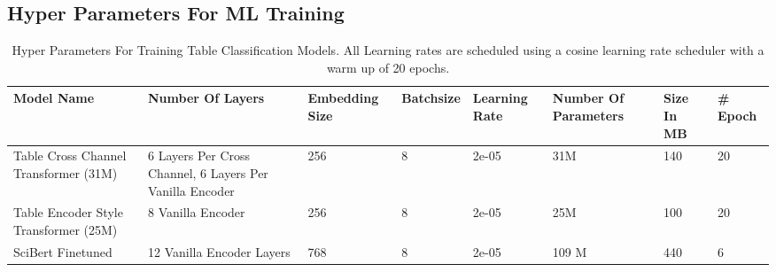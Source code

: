 \subsection{Hyper Parameters For ML Training}
\begin{table}[h]
  \label{table\arabic{tablecounter}}
  \centering
  \begin{tabular}{|p{1.25cm}|p{1.25cm}|p{1.75cm}|p{1.5cm}|p{1.5cm}|p{1.5cm}|p{1cm}|p{1cm}|}
  \hline
      Model Name & Number Of Layers &  Embedding Size & Batchsize & Learning Rate & Number Of Parameters & Size In MB & \# Epoch\\ \hline
      Table Cross Channel Transformer (31M) & 6 Layers Per Cross Channel, 6 Layers Per Vanilla Encoder & 256 & 8 & 2e-05 & 31M & 140 & 20\\ \hline
      Table Encoder Style Transformer (25M) & 8 Vanilla Encoder & 256 & 8 & 2e-05 & 25M & 100 & 20\\ \hline
      SciBert Finetuned & 12 Vanilla Encoder Layers & 768 & 8 & 2e-05 & 109 M & 440 & 6 \\ \hline
  \end{tabular}
  \caption{\label{tablecounter} Hyper Parameters For Training Table Classification Models. All Learning rates are scheduled using a cosine learning rate scheduler with a warm up of 20 epochs. }
\end{table}
